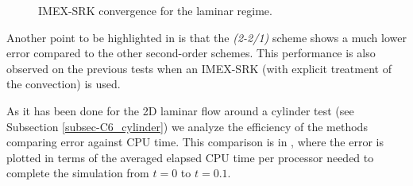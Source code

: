 \begin{figure}[h!]
  \centering
  \caption{IMEX-SRK convergence for the laminar regime.}
  \label{fig-TGV_conv_laminar}
\end{figure}

Another point to be highlighted in  is that the \textit{(2-2/1)} scheme shows a much lower error compared to the other second-order schemes. This performance is also observed on the previous tests when an IMEX-SRK (with explicit treatment of the convection) is used. 

As it has been done for the 2D laminar flow around a cylinder test (see Subsection \ref{subsec-C6_cylinder}) we analyze the efficiency of the methods comparing error  against CPU time. This comparison is in  , where the error is plotted in terms of the averaged elapsed CPU time per processor needed to complete the simulation from $t=0$ to $t=0.1$.

